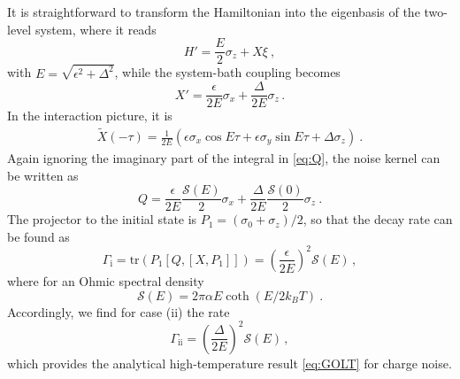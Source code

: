 \documentclass[twocolumn,prb,showpacs]{revtex4-1}
\newcommand*{\tr}[1]{\mathrm{tr}\left(#1\right)}
\begin{document}
It is straightforward to transform the Hamiltonian into the eigenbasis of
the two-level system, where it reads
\begin{equation}
 H' = \frac{E}{2}\sigma_z+X\xi \ , 
\end{equation}
with $E=\sqrt{\epsilon^2 + \Delta^2}$, while the system-bath coupling becomes
\begin{equation}
	X'= \frac{\epsilon}{2E}\sigma_x + \frac{\Delta}{2E}\sigma_z \,.
\end{equation}
In the interaction picture, it is
\begin{multline}
 \tilde{X}(-\tau) %
 =\frac{1}{2E}\left(\epsilon\sigma_x\cos E\tau + \epsilon\sigma_y\sin E \tau + \Delta\sigma_z\right) \ .
\end{multline}
Again ignoring the imaginary part of the integral in \eqref{eq:Q}, the
noise kernel can be written as
\begin{equation}
 Q = \frac{\epsilon}{2E}\frac{\mathcal{S}(E)}{2}\sigma_x + \frac{\Delta}{2E}\frac{\mathcal{S}(0)}{2}\sigma_z \ .
\end{equation}
The projector to the initial state is $P_1=(\sigma_0 + \sigma_z)/2$, so
that the decay rate can be found as
\begin{equation}
    \Gamma_\text{i} = \tr{P_1[Q,[X,P_1]]}
    = \left(\frac{\epsilon}{2E}\right)^2\mathcal{S}(E) \,,
    \label{eq:gammatls}
\end{equation}
where for an Ohmic spectral density
\begin{equation}
 \mathcal{S}(E)=2\pi \alpha E \coth(E/2k_B T) \ .
\end{equation}
Accordingly, we find for case (ii) the rate
\begin{equation}
\label{app:Gammaii}
    \Gamma_\text{ii}
    = \left(\frac{\Delta}{2E}\right)^2\mathcal{S}(E) \,,
\end{equation}
which provides the analytical high-temperature result \eqref{eq:GOLT} for
charge noise.


\end{document}
